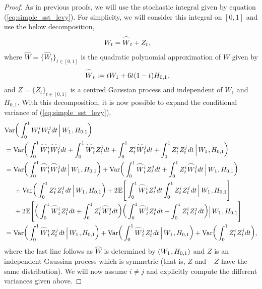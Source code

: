 \documentclass[sn-mathphys-num]{sn-jnl}%
\newcommand{\E}{\mathbb{E}}
\newcommand{\m}{\hspace{0.25mm}}
\newcommand{\mm}{\hspace{5mm}}
\newcommand{\var}{\mathrm{Var}}
\begin{document}
\begin{proof}
As in previous proofs, we will use the stochastic integral given by equation (\ref{eq:simple_sst_levy}).
For simplicity, we will consider this integral on $[0,1]$ and use the below decomposition,
\begin{align*}
W_t & = \wideparen{W}_t + Z_t\m,
\end{align*}
where $\wideparen{W} = \{\wideparen{W}_t\}_{t\in[0,1]}$ is the quadratic polynomial approximation of $W$ given by
\begin{align*}
\wideparen{W}_t & := tW_1 + 6t(1-t)H_{0,1}\m,
\end{align*}
and $Z = \{Z_t\}_{t\in[0,1]}$ is a centred Gaussian process and independent of $W_1$ and $H_{0,1}$.
With this decomposition, it is now possible to expand the conditional variance of (\ref{eq:simple_sst_levy}),
\begin{align}\label{eq:variance_calculation}
&\var\bigg(\int_0^1 W_t^i\m W_t^j dt\, \Big|\, W_1\m, H_{0,1}\bigg)\\
& = \var\bigg(\int_0^1 \wideparen{W}_t^i\m \wideparen{W}_t^j dt + \int_0^1 \wideparen{W}_t^i\m Z_t^j dt + \int_0^1 Z_t^i\m \wideparen{W}_t^j dt + \int_0^1 Z_t^i\m Z_t^j\m dt\, \Big|\, W_1\m, H_{0,1}\bigg)\nonumber\\
& = \var\bigg(\int_0^1 \wideparen{W}_t^i\m \wideparen{W}_t^j dt\, \Big|\, W_1\m, H_{0,1}\bigg) + \var\bigg(\int_0^1 \wideparen{W}_t^i\m Z_t^j dt + \int_0^1 Z_t^i\m \wideparen{W}_t^j dt\, \Big|\, W_1\m, H_{0,1}\bigg)\nonumber\\
&\mm + \var\bigg(\int_0^1 Z_t^i\m Z_t^j\m dt\, \Big|\, W_1\m, H_{0,1}\bigg) + 2\m\E\Bigg[\int_0^1 \wideparen{W}_t^i\m Z_t^j dt\int_0^1 Z_t^i\m Z_t^j\m dt\, \Big|\, W_1\m, H_{0,1}\Bigg]\nonumber\\[-3pt]
&\mm  + 2\m\E\Bigg[\bigg(\int_0^1 \wideparen{W}_t^i\m Z_t^j dt + \int_0^1 Z_t^i\m \wideparen{W}_t^j dt\bigg)\bigg(\int_0^1 \wideparen{W}_t^i\m Z_t^j dt + \int_0^1 Z_t^i\m Z_t^j\m dt\bigg)\Big|\, W_1\m, H_{0,1}\Bigg]\nonumber\\
& = \var\bigg(\int_0^1 \wideparen{W}_t^i\m Z_t^j\m dt\, \Big|\, W_1\m, H_{0,1}\bigg) + \var\bigg(\int_0^1 \wideparen{W}_t^j\m Z_t^i\m dt\, \Big|\, W_1\m, H_{0,1}\bigg) + \var\bigg(\int_0^1 Z_t^i\m Z_t^j dt\bigg),\nonumber
\end{align}
where the last line follows as $\wideparen{W}$ is determined by $(W_1\m, H_{0,1})$ and $Z$ is an independent Gaussian process which is symmetric (that is, $Z$ and $-Z$ have the same distribution).
We will now assume $i\neq j$ and explicitly compute the different variances given above.

\end{proof}
\end{document}
